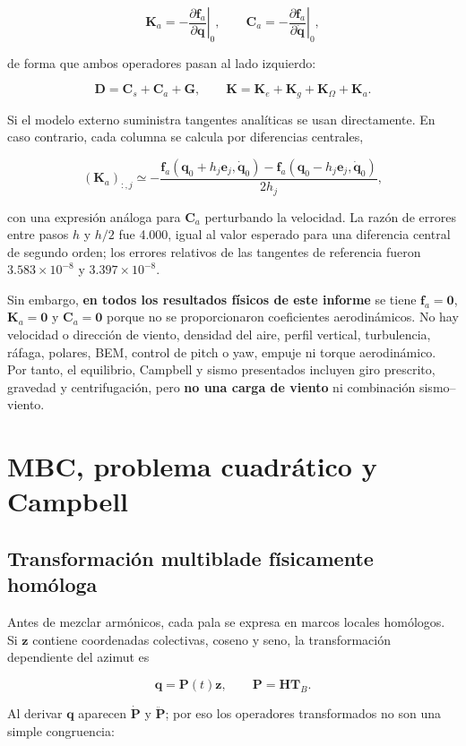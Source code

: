 \documentclass[oneside,a4paper,spanish,links]{amca}
\begin{document}
\[
\bm K_a=-\left.\frac{\partial\bm f_a}{\partial\bm q}\right|_0,
\qquad
\bm C_a=-\left.\frac{\partial\bm f_a}{\partial\dot{\bm q}}\right|_0,
\]

de forma que ambos operadores pasan al lado izquierdo:

\[
\bm D=\bm C_s+\bm C_a+\bm G,
\qquad
\bm K=\bm K_e+\bm K_g+\bm K_\Omega+\bm K_a.
\]

Si el modelo externo suministra tangentes analíticas se usan directamente. En caso contrario, cada columna se calcula por diferencias centrales,

\[
(\bm K_a)_{:,j}\simeq-
\frac{\bm f_a(\bm q_0+h_j\bm e_j,\dot{\bm q}_0)
-\bm f_a(\bm q_0-h_j\bm e_j,\dot{\bm q}_0)}{2h_j},
\]

con una expresión análoga para $\bm C_a$ perturbando la velocidad. La razón de errores entre pasos $h$ y $h/2$ fue 4.000, igual al valor esperado para una diferencia central de segundo orden; los errores relativos de las tangentes de referencia fueron $3.583\times10^{-8}$ y $3.397\times10^{-8}$.

Sin embargo, \textbf{en todos los resultados físicos de este informe} se tiene $\bm f_a=\bm0$, $\bm K_a=\bm0$ y $\bm C_a=\bm0$ porque no se proporcionaron coeficientes aerodinámicos. No hay velocidad o dirección de viento, densidad del aire, perfil vertical, turbulencia, ráfaga, polares, BEM, control de pitch o yaw, empuje ni torque aerodinámico. Por tanto, el equilibrio, Campbell y sismo presentados incluyen giro prescrito, gravedad y centrifugación, pero \textbf{no una carga de viento} ni combinación sismo--viento.

\section{MBC, problema cuadrático y Campbell}

\subsection{Transformación multiblade físicamente homóloga}

Antes de mezclar armónicos, cada pala se expresa en marcos locales homólogos. Si $\bm z$ contiene coordenadas colectivas, coseno y seno, la transformación dependiente del azimut es

\[
\bm q=\bm P(t)\bm z,
\qquad
\bm P=\bm H\bm T_B.
\]

Al derivar $\bm q$ aparecen $\dot{\bm P}$ y $\ddot{\bm P}$; por eso los operadores transformados no son una simple congruencia:
\end{document}
